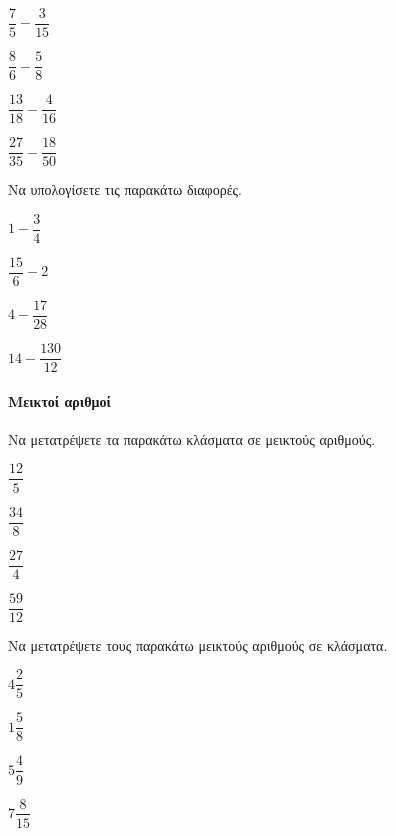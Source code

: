 \documentclass[11pt,a4paper,modern]{FFExercises}
\begin{document}
\begin{multicols}{2}
\begin{alist}
\item $ \dfrac{7}{5}-\dfrac{3}{15} $
\item $ \dfrac{8}{6}-\dfrac{5}{8} $
\item $ \dfrac{13}{18}-\dfrac{4}{16} $
\item $ \dfrac{27}{35}-\dfrac{18}{50} $
\end{alist}
\end{multicols}
\askhsh
Να υπολογίσετε τις παρακάτω διαφορές.
\begin{multicols}{2}
\begin{alist}
\item $ 1-\dfrac{3}{4} $
\item $ \dfrac{15}{6}-2 $
\item $ 4-\dfrac{17}{28} $
\item $ 14-\dfrac{130}{12} $
\end{alist}
\end{multicols}
\paragraph{Μεικτοί αριθμοί}
\askhsh
Να μετατρέψετε τα παρακάτω κλάσματα σε μεικτούς αριθμούς.
\begin{multicols}{4}
\begin{alist}
\item $ \dfrac{12}{5} $
\item $ \dfrac{34}{8} $
\item $ \dfrac{27}{4} $
\item $ \dfrac{59}{12} $
\end{alist}
\end{multicols}
\askhsh
Να μετατρέψετε τους παρακάτω μεικτούς αριθμούς σε κλάσματα.
\begin{multicols}{4}
\begin{alist}
\item $ 4\dfrac{2}{5} $
\item $ 1\dfrac{5}{8} $
\item $ 5\dfrac{4}{9} $
\item $ 7\dfrac{8}{15} $
\end{alist}
\end{multicols}
\end{document}
